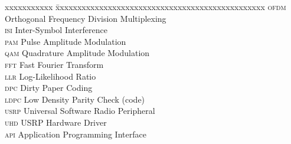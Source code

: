 \abbreviations

\noindent
\begin{tabbing}
	xxxxxxxxxxx \= xxxxxxxxxxxxxxxxxxxxxxxxxxxxxxxxxxxxxxxxxxxxxxxx \kill
	\textsc{ofdm} \> Orthogonal Frequency Division Multiplexing \\
	\textsc{isi}  \> Inter-Symbol Interference \\
	\textsc{pam}  \> Pulse Amplitude Modulation \\
	\textsc{qam}  \> Quadrature Amplitude Modulation \\
	\textsc{fft}  \> Fast Fourier Transform \\
	\textsc{llr}  \> Log-Likelihood Ratio \\
	\textsc{dpc}  \> Dirty Paper Coding \\
	\textsc{ldpc} \> Low Density Parity Check (code) \\
	\textsc{usrp} \> Universal Software Radio Peripheral \\
	\textsc{uhd}  \> USRP Hardware Driver \\
	\textsc{api}  \> Application Programming Interface \\
\end{tabbing}

